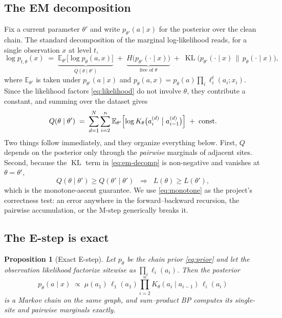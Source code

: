 \documentclass[11pt]{article}
\newtheorem{proposition}{Proposition}
\theoremstyle{remark}
\newcommand{\E}{\mathbb{E}}
\newcommand{\KL}{\operatorname{KL}}
\begin{document}
\subsection{The EM decomposition}

Fix a current parameter $\theta'$ and write $p_{\theta'}(a \mid x)$ for the
posterior over the clean chain. The standard decomposition of the marginal
log-likelihood reads, for a single observation $x$ at level $t$,
\begin{equation}
  \log p_{t,\theta}(x)
  \;=\;
  \underbrace{\E_{\theta'}\!\bigl[\log p_\theta(a,x)\bigr]}_{\textstyle Q(\theta\mid\theta')}
  \;+\;
  \underbrace{H\bigl(p_{\theta'}(\cdot\mid x)\bigr)}_{\text{free of }\theta}
  \;+\;
  \KL\bigl(p_{\theta'}(\cdot \mid x) \,\big\|\, p_{\theta}(\cdot \mid x)\bigr),
  \label{eq:em-decomp}
\end{equation}
where $\E_{\theta'}$ is taken under $p_{\theta'}(a \mid x)$ and
$p_\theta(a,x) = p_\theta(a)\prod_i \ell^t_i(a_i;x_i)$. Since the likelihood
factors \eqref{eq:likelihood} do not involve $\theta$, they contribute a
constant, and summing over the dataset gives
\begin{equation}
  Q(\theta \mid \theta')
  \;=\;
  \sum_{d=1}^{N} \sum_{i=2}^{n}
  \E_{\theta'}\!\left[\log K_\theta\bigl(a^{(d)}_i \bigm| a^{(d)}_{i-1}\bigr)\right]
  \;+\; \text{const}.
  \label{eq:Q}
\end{equation}
Two things follow immediately, and they organize everything below. First,
$Q$ depends on the posterior only through the \emph{pairwise} marginals of
adjacent sites. Second, because the $\KL$ term in \eqref{eq:em-decomp} is
non-negative and vanishes at $\theta = \theta'$,
\begin{equation}
  Q(\theta \mid \theta') \ge Q(\theta' \mid \theta')
  \;\;\Longrightarrow\;\;
  L(\theta) \ge L(\theta'),
  \label{eq:monotone}
\end{equation}
which is the monotone-ascent guarantee. We use \eqref{eq:monotone} as the
project's correctness test: an error anywhere in the forward--backward
recursion, the pairwise accumulation, or the M-step generically breaks it.

\subsection{The E-step is exact}

\begin{proposition}[Exact E-step]
\label{prop:exact-estep}
Let $p_\theta$ be the chain prior \eqref{eq:prior} and let the observation
likelihood factorize sitewise as $\prod_i \ell_i(a_i)$. Then the posterior
\begin{equation}
  p_\theta(a \mid x) \;\propto\;
  \mu(a_1)\,\ell_1(a_1) \prod_{i=2}^{n} K_\theta(a_i \mid a_{i-1})\,\ell_i(a_i)
\end{equation}
is a Markov chain on the same graph, and sum--product BP computes its
single-site and pairwise marginals exactly.
\end{proposition}
\end{document}
